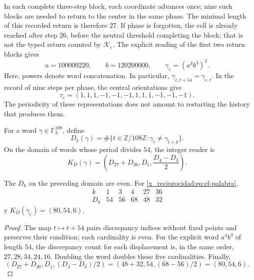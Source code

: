 In each complete three-step block, each coordinate advances
once; nine such blocks are needed to return to the center in
the same phase. The minimal length of this recorded return is
therefore \(27\). If phase is forgotten, the cell is already reached after
step \(26\), before the neutral threshold completing the block; that is not
the typed return counted by \(\mathcal K_e\). The explicit reading
of the first two return blocks gives
\begin{equation}
 a=100000220,\qquad b=120200000,\qquad
 \gamma_e=(a^3b^3)^2.
 \label{x_reciprocidad:eq:el-palabra}
\end{equation}
Here, powers denote word concatenation. In particular,
\(\gamma_{e,t+54}=\gamma_{e,t}\). In the record of nine steps per
phase, the central orientations give
\begin{equation}
 \tau_e=(1,1,1,-1,-1,-1,1,1,1,-1,-1,-1).
 \label{x_reciprocidad:eq:el-tau}
\end{equation}
The periodicity of these representations does not amount to restarting the
history that produces them.

\begin{definition}
For a word \(\gamma\in\mathbb F_3^{108}\), define
\[
 D_k(\gamma)=\#\{t\in\mathbb Z/108\mathbb Z:
                   \gamma_t\ne\gamma_{t+k}\}.
\]
On the domain of words whose period divides \(54\), the integer
reader is
\begin{equation}
 K_D(\gamma)=\left(D_{27}+D_{36},D_1,\frac{D_4-D_3}{2}\right).
 \label{x_reciprocidad:eq:el-kd}
\end{equation}
\end{definition}

\begin{lemma}
The \(D_k\) on the preceding domain are even. For
\eqref{x_reciprocidad:eq:el-palabra},
\[
 \begin{array}{c|rrrrr}
 k&1&3&4&27&36\\\hline
 D_k&54&56&68&48&32
 \end{array}
\]
y \(K_D(\gamma_e)=(80,54,6)\).
\end{lemma}
\begin{proof}
The map \(t\mapsto t+54\) pairs discrepancy indices without fixed
points and preserves their condition; each cardinality is even. For the
explicit word \(a^3b^3\) of length \(54\), the discrepancy
count for each displacement is, in the same order,
\(27,28,34,24,16\). Doubling the word doubles these five cardinalities.
Finally,
\[
 (D_{27}+D_{36},D_1,(D_4-D_3)/2)
 =(48+32,54,(68-56)/2)=(80,54,6).
\]
\end{proof}

